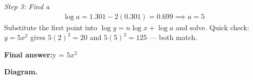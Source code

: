 \documentclass[11pt]{article}
\begin{document}
\textit{Step 3: Find a}
\[\begin{gathered}
\log a = 1.301 - 2(0.301) = 0.699 \implies a = 5
\end{gathered}\]
Substitute the first point into \( \log y = n\log x + \log a \) and solve. Quick check: \( y = 5x^2 \) gives \( 5(2)^2 = 20 \) and \( 5(5)^2 = 125 \) --- both match.

\begin{answerbox}
\textbf{Final answer:}\quad y = $5x^2$
\end{answerbox}
\textbf{Diagram.}

\begin{center}
\end{center}
\end{document}
